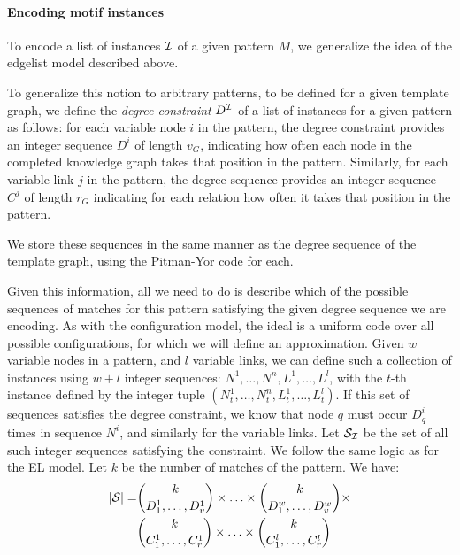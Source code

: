 \documentclass[runningheads]{style/llncs}
\newcommand{\cS}{{\cal S}}
\newcommand{\I}{{\cal I}}
\begin{document}
\paragraph{Encoding motif instances} To encode a list of instances $\I$ of a given pattern $M$, we generalize  the idea of the edgelist model described above. 

 
 To generalize this notion to arbitrary patterns, to be defined for a given template graph, we define the \emph{degree constraint} $D^\I$ of a list of instances for a given pattern as follows: for each variable node $i$ in the pattern, the degree constraint provides an integer sequence $D^i$ of length $v_G$, indicating how often each node in the completed knowledge graph takes that position in the pattern. Similarly, for each variable link $j$ in the pattern, the degree sequence provides an integer sequence $C^j$ of length $r_G$ indicating for each relation how often it takes that position in the pattern.
 
 We store these sequences in the same manner as the degree sequence of the template graph, using the Pitman-Yor code for each.
 
Given this information, all we need to do is describe which of the possible sequences of matches for this pattern satisfying the given degree sequence we are encoding. As with the configuration model, the ideal is a uniform code over all possible configurations, for which we will define an approximation. Given $w$ variable nodes in a pattern, and $l$ variable links, we can define such a collection of instances using $w+l$ integer sequences: $N^1, \ldots, N^n, L^1, \ldots, L^l$, with the $t$-th instance defined by the integer tuple $(N^1_t, \ldots, N^n_t, L^1_t, \ldots, L^l_t)$. If this set of sequences satisfies the degree constraint, we know that node $q$ must occur $D^i_q$ times in sequence $N^i$, and similarly for the variable links. Let $\cS_\I$ be the set of all such integer sequences satisfying the  constraint. We follow the same logic as for the EL model. Let $k$ be the number of matches of the pattern. We have:
\begin{align*}
|\cS| = &{k \choose D^1_1, \ldots, D^1_v}\times \ldots \times{k \choose D^w_1, \ldots, D^w_v}\times \\
&{k \choose C^1_1, \ldots, C^1_r}\times \ldots \times{k \choose C^l_1, \ldots, C^l_r}
\end{align*}
\end{document}
